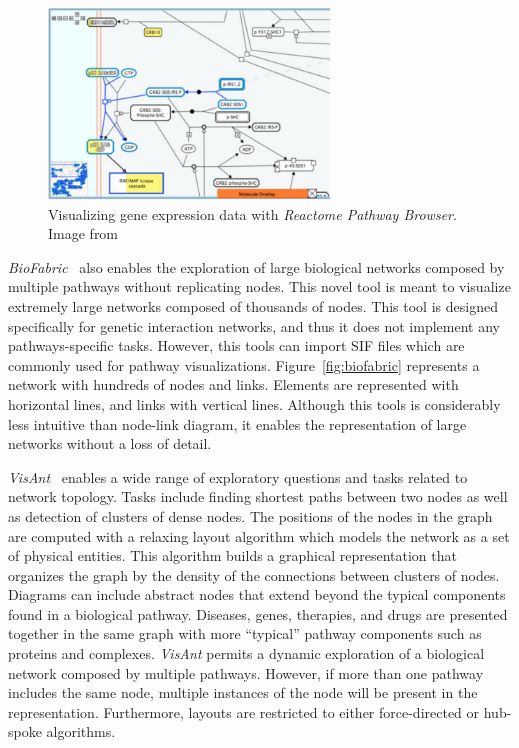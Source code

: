 \documentclass[review,journal]{vgtc}         %
\newcounter{task}
\begin{document}
\begin{figure}[h]
  \centering
  \includegraphics[height=2in]{figures/reactome}
  \caption{Visualizing gene expression data with \emph{Reactome Pathway Browser}. Image from ~\cite{reactome}}
  \label{fig:reactome}
\end{figure}

\textit{BioFabric}~\cite{Longabaugh2012biofabric} also enables the exploration of large biological networks composed by multiple pathways without replicating nodes. This novel tool is meant to visualize extremely large networks composed of thousands of nodes. This tool is designed specifically for genetic interaction networks, and thus it does not implement any pathways-specific tasks. However, this tools can import SIF files which are commonly used for pathway visualizations. Figure~\ref{fig:biofabric} represents a network with hundreds of nodes and links. Elements are represented with horizontal lines, and links with vertical lines. Although this tools is considerably less intuitive than node-link diagram, it enables the representation of large networks without a loss of detail.

\textit{VisAnt}~\cite{hu2004visant} enables a wide range of exploratory questions and tasks related to network topology. Tasks include finding shortest paths between two nodes \cite{hu2013visant} as well as detection of clusters of dense nodes. The positions of the nodes in the graph are computed with a relaxing layout algorithm which models the network as a set of physical entities. This algorithm builds a graphical representation that organizes the graph by the density of the connections between clusters of nodes. Diagrams can include abstract nodes that extend beyond the typical components found in a biological pathway. Diseases, genes, therapies, and drugs are presented together in the same graph with more ``typical'' pathway components such as proteins and complexes. \textit{VisAnt} permits a dynamic exploration of a biological network composed by multiple pathways. However, if more than one pathway includes the same node, multiple instances of the node will be present in the representation. Furthermore, layouts are restricted to either force-directed or hub-spoke algorithms.
\end{document}
